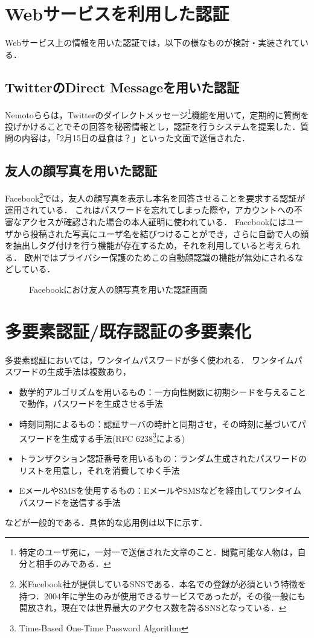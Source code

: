 \section{Webサービスを利用した認証}
Webサービス上の情報を用いた認証では，以下の様なものが検討・実装されている．

\subsection{TwitterのDirect Messageを用いた認証}\label{subsec:twitterDMAuth}
Nemotoら\cite{nemoto:2006-03-15}らは，Twitterのダイレクトメッセージ\footnote{特定のユーザ宛に，一対一で送信された文章のこと．閲覧可能な人物は，自分と相手のみである．}機能を用いて，定期的に質問を投げかけることでその回答を秘密情報とし，認証を行うシステムを提案した．質問の内容は，「2月15日の昼食は？」といった文面で送信された．

\subsection{友人の顔写真を用いた認証}\label{subsec:facebookFaceAuth}
Facebook\footnote{米Facebook社が提供しているSNSである．本名での登録が必須という特徴を持つ．2004年に学生のみが使用できるサービスであったが，その後一般にも開放され，現在では世界最大のアクセス数を誇るSNSとなっている．}では，友人の顔写真を表示し本名を回答させることを要求する認証が運用されている．
これはパスワードを忘れてしまった際や，アカウントへの不審なアクセスが確認された場合の本人証明に使われている．
Facebookにはユーザから投稿された写真にユーザ名を結びつけることができ，さらに自動で人の顔を抽出しタグ付けを行う機能が存在するため，それを利用していると考えられる．
欧州ではプライバシー保護のためこの自動顔認識の機能が無効にされるなどしている．

\begin{figure}[ht]
  \begin{center}
  \end{center}
  \caption{Facebookにおけ友人の顔写真を用いた認証画面}
  \label{fig:facebookFaceAuth}
\end{figure}

\section{多要素認証/既存認証の多要素化}\label{sec:multifactor}
多要素認証においては，ワンタイムパスワードが多く使われる．
ワンタイムパスワードの生成手法は複数あり，
\begin{itemize}
\item 数学的アルゴリズムを用いるもの：一方向性関数に初期シードを与えることで動作，パスワードを生成させる手法
\item 時刻同期によるもの：認証サーバの時計と同期させ，その時刻に基づいてパスワードを生成する手法(RFC 6238\footnote{Time-Based One-Time Password Algorithm}による)
\item トランザクション認証番号を用いるもの：ランダム生成されたパスワードのリストを用意し，それを消費してゆく手法
\item EメールやSMSを使用するもの：EメールやSMSなどを経由してワンタイムパスワードを送信する手法
\end{itemize}
などが一般的である．具体的な応用例は以下に示す．

